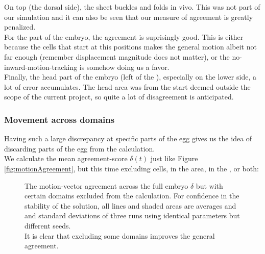 On top (the dorsal side), the sheet buckles and folds in vivo. This was not part of our simulation and it can also be seen that our measure of agreement is greatly penalized.\\

For the  part of the embryo, the agreement is suprisingly good. This is either because the cells that start at this positions makes the general motion albeit not far enough (remember displacement magnitude does not matter), or the no-inward-motion-tracking is somehow doing us a favor.\\


Finally, the head part of the embryo (left of the ), especially on the lower side, a lot of error accumulates. The head area was from the start deemed outside the scope of the current project, so quite a lot of disagreement is anticipated.\\


\subsubsection{Movement across domains}
Having such a large discrepancy at specific parts of the egg gives us the idea of discarding parts of the egg from the calculation.\\


We calculate the mean agreement-score $\delta(t)$ just like Figure \ref{fig:motionAgreement}, but this time excluding cells, in the  area, in the , or both:



\begin{figure}[H]
    \centering
    \caption{The motion-vector agreement across the full embryo $\delta$ but with certain domains excluded from the calculation. For confidence in the stability of the solution, all lines and shaded areas are averages and and standard deviations of three runs using identical parameters but different seeds.\\It is clear that excluding some domains improves the general agreement.}
    \label{fig:vector-subsets}
\end{figure}

